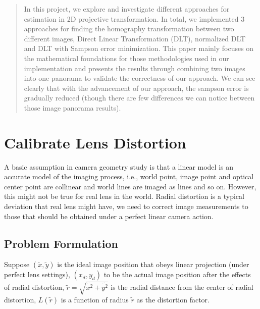 \documentclass[conference]{IEEEtran}
\begin{document}




\maketitle
\begin{abstract}
In this project, we explore and investigate different approaches for estimation in 2D projective transformation. In total, we implemented 3 approaches for finding the homography transformation between two different images, Direct Linear Transformation (DLT), normalized DLT and DLT with Sampson error minimization. This paper mainly focuses on the mathematical foundations for those methodologies used in our implementation and presents the results through combining two images into one panorama to validate the correctness of our approach. We can see clearly that with the advancement of our approach, the sampson error is gradually reduced (though there are few differences we can notice between those image panorama results).
\end{abstract}





%
\IEEEpeerreviewmaketitle


\section{Calibrate Lens Distortion}
A basic assumption in camera geometry study is that a linear model is an accurate model of the imaging process, i.e., world point, image point and optical center point are collinear and world lines are imaged as lines and so on. However, this might not be true for real lens in the world. Radial distortion is a typical deviation that real lens might have, we need to correct image measurements to those that should be obtained under a perfect linear camera action.

\subsection{Problem Formulation}
Suppose $(\tilde{x}, \tilde{y})$ is the ideal image position that obeys linear projection (under perfect lens settings), $(x_d, y_d)$ to be the actual image position after the effects of radial distortion, $\tilde{r} = \sqrt{\tilde{x^2} + \tilde{y^2}}$ is the radial distance from the center of radial distortion, $L(\tilde{r})$ is a function of radius $\tilde{r}$ as the distortion factor. 
\end{document}
